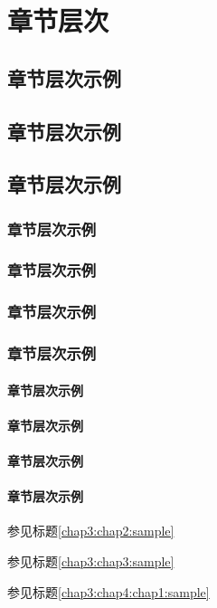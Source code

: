 \chapter{章节层次}
\section{章节层次示例 }
\label{chap1:sample}
\setcounter{subsubsection}{0}
\section{章节层次示例 \label{chap2:sample}}
\section{章节层次示例 \label{chap3:sample}}
\subsection{章节层次示例 \label{chap3:chap1:sample}}
\subsection{章节层次示例 \label{chap3:chap2:sample}}
\subsection{章节层次示例 \label{chap3:chap3:sample}}
\subsection{章节层次示例 \label{chap3:chap4:sample}}
\subsubsection{章节层次示例 \label{chap3:chap4:chap1:sample}}
\subsubsection{章节层次示例 \label{chap3:chap4:chap2:sample}}
\subsubsection{章节层次示例 \label{chap3:chap4:chap3:sample}}
\subsubsection{章节层次示例 \label{chap3:chap4:chap4:sample}}

参见标题\ref{chap3:chap2:sample}

参见标题\ref{chap3:chap3:sample}

参见标题\ref{chap3:chap4:chap1:sample}

